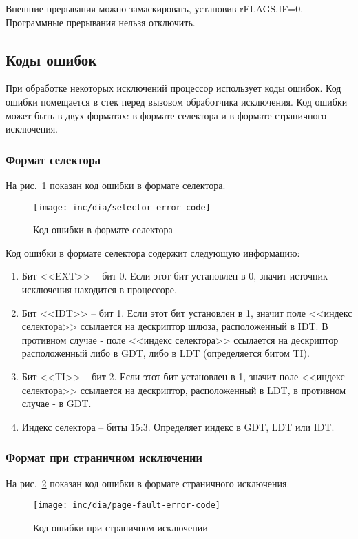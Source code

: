 Внешние прерывания можно замаскировать, установив rFLAGS.IF=0. Программные
прерывания нельзя отключить.

\subsection{Коды ошибок}
При обработке некоторых исключений процессор использует коды ошибок. Код
ошибки помещается в стек перед вызовом обработчика исключения. Код ошибки
может быть в двух форматах: в формате селектора и в формате страничного исключения.

\subsubsection*{Формат селектора}
На рис.~\ref{fig:selector_error_code} показан код ошибки в формате селектора.
\begin{figure}[ht!]
  \centering
  \texttt{[image: inc/dia/selector-error-code]}
  \caption{Код ошибки в формате селектора}
  \label{fig:selector_error_code}
\end{figure}

Код ошибки в формате селектора содержит следующую информацию:
\begin{enumerate}[1.]
\item Бит <<EXT>> -- бит 0. Если этот бит установлен в 0, значит источник
	исключения находится в процессоре.
\item Бит <<IDT>> -- бит 1. Если этот бит установлен в 1, значит поле <<индекс
селектора>> ссылается на дескриптор шлюза, расположенный в IDT. В
противном случае - поле <<индекс селектора>> ссылается на дескриптор
расположенный либо в GDT, либо в LDT (определяется битом TI).
\item Бит <<TI>> -- бит 2. Если этот бит установлен в 1, значит поле <<индекс
селектора>> ссылается на дескриптор, расположенный в LDT, в противном случае -
в GDT.
\item Индекс селектора -- биты 15:3. Определяет индекс в GDT, LDT или IDT.
\end{enumerate}

\subsubsection*{Формат при страничном исключении}
На рис.~\ref{fig:page_fault_error_code} показан код ошибки в формате страничного исключения.

\begin{figure}[ht!]
  \centering
  \texttt{[image: inc/dia/page-fault-error-code]}
  \caption{Код ошибки при страничном исключении}
  \label{fig:page_fault_error_code}
\end{figure}

